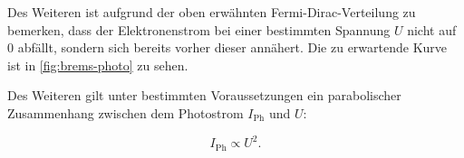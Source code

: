 Des Weiteren ist aufgrund der oben erwähnten Fermi-Dirac-Verteilung zu bemerken, dass der Elektronenstrom bei einer bestimmten Spannung $U$ nicht auf 0 abfällt,
sondern sich bereits vorher dieser annähert. Die zu erwartende Kurve ist in \autoref{fig:brems-photo} zu sehen.

Des Weiteren gilt unter bestimmten Voraussetzungen ein parabolischer Zusammenhang zwischen dem Photostrom $I_\text{Ph}$ und $U$:

\begin{equation}
    \label{eqn:i-u}
    I_\text{Ph} \propto U^2.
\end{equation}